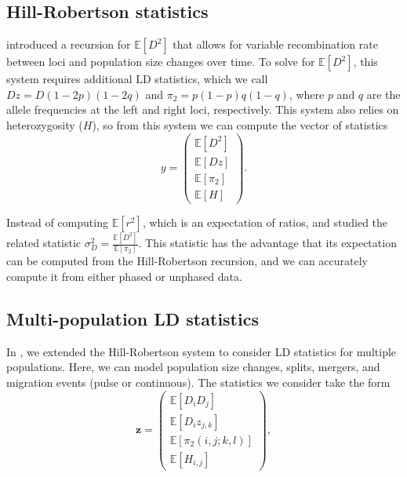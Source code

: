 \documentclass[11pt]{article}
\newcommand{\E}{\mathbb{E}}
\begin{document}
\subsection{Hill-Robertson statistics}

\citet{Hill1968} introduced a recursion for $\E[D^2]$ that allows for variable recombination rate between loci and population size changes over time.
To solve for $\E[D^2]$, this system requires additional LD statistics, which we call $Dz = D(1-2p)(1-2q)$ and $\pi_2 = p(1-p)q(1-q)$, where $p$ and $q$ are the allele frequencies at the left and right loci, respectively.
This system also relies on heterozygosity ($H$), so from this system we can compute the vector of statistics
$$y=\begin{pmatrix} \E[D^2] \\ \E[Dz] \\ \E[\pi_2] \\ \E[H] \end{pmatrix}.$$

Instead of computing $\E[r^2]$, which is an expectation of ratios, \citet{Hill1968} and \citet{Ohta1971} studied the related statistic $\sigma_D^2 = \frac{\E[D^2]}{\E[\pi_2]}$.
This statistic has the advantage that its expectation can be computed from the Hill-Robertson recursion, and we can accurately compute it from either phased or unphased data.

\subsection{Multi-population LD statistics}

In \citet{Ragsdale2018}, we extended the Hill-Robertson system to consider LD statistics for multiple populations.
Here, we can model population size changes, splits, mergers, and migration events (pulse or continuous).
The statistics we consider take the form
$$
\mathbf{z} = \begin{pmatrix} 
\E[D_i D_j] \\
\E[D_i z_{j,k}] \\
\E[{\pi_2}(i,j;k,l)] \\
\E[H_{i,j}]
\end{pmatrix},
$$
\end{document}
